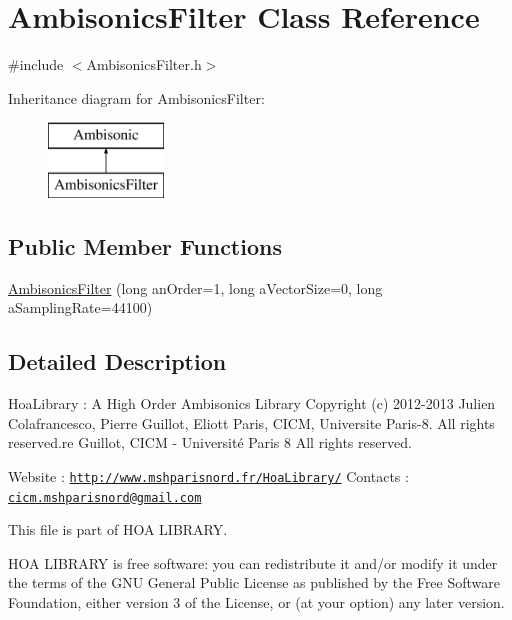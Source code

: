\hypertarget{class_ambisonics_filter}{\section{Ambisonics\-Filter Class Reference}
\label{class_ambisonics_filter}
}


{\ttfamily \#include $<$Ambisonics\-Filter.\-h$>$}

Inheritance diagram for Ambisonics\-Filter\-:\begin{figure}[H]
\begin{center}
\leavevmode
\includegraphics[height=2.000000cm]{class_ambisonics_filter}
\end{center}
\end{figure}
\subsection*{Public Member Functions}
\begin{DoxyCompactItemize}
\item 
\hyperlink{class_ambisonics_filter_aeeafcaad4a5d3081d777c3e8bb03ed0c}{Ambisonics\-Filter} (long an\-Order=1, long a\-Vector\-Size=0, long a\-Sampling\-Rate=44100)
\end{DoxyCompactItemize}


\subsection{Detailed Description}
Hoa\-Library \-: A High Order Ambisonics Library Copyright (c) 2012-\/2013 Julien Colafrancesco, Pierre Guillot, Eliott Paris, C\-I\-C\-M, Universite Paris-\/8. All rights reserved.\-re Guillot, C\-I\-C\-M -\/ Université Paris 8 All rights reserved.

Website \-: \href{http://www.mshparisnord.fr/HoaLibrary/}{\tt http\-://www.\-mshparisnord.\-fr/\-Hoa\-Library/} Contacts \-: \href{mailto:cicm.mshparisnord@gmail.com}{\tt cicm.\-mshparisnord@gmail.\-com}

This file is part of H\-O\-A L\-I\-B\-R\-A\-R\-Y.

H\-O\-A L\-I\-B\-R\-A\-R\-Y is free software\-: you can redistribute it and/or modify it under the terms of the G\-N\-U General Public License as published by the Free Software Foundation, either version 3 of the License, or (at your option) any later version.

